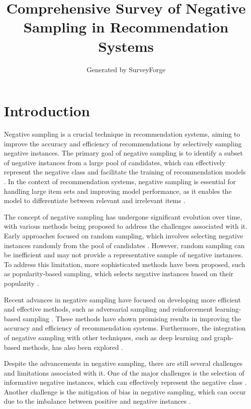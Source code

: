 \documentclass[11pt,a4paper]{article}
\title{Comprehensive Survey of Negative Sampling in Recommendation Systems}
\author{Generated by SurveyForge}
\date{}
\begin{document}
\maketitle
\tableofcontents
\newpage



\section{Introduction}


Negative sampling is a crucial technique in recommendation systems, aiming to improve the accuracy and efficiency of recommendations by selectively sampling negative instances. The primary goal of negative sampling is to identify a subset of negative instances from a large pool of candidates, which can effectively represent the negative class and facilitate the training of recommendation models \cite{arxiv:1410.8251}. In the context of recommendation systems, negative sampling is essential for handling large item sets and improving model performance, as it enables the model to differentiate between relevant and irrelevant items \cite{doi:10.1145/3097983.3098202}.

The concept of negative sampling has undergone significant evolution over time, with various methods being proposed to address the challenges associated with it. Early approaches focused on random sampling, which involves selecting negative instances randomly from the pool of candidates \cite{doi:10.1137/1.9781611972818.33}. However, random sampling can be inefficient and may not provide a representative sample of negative instances. To address this limitation, more sophisticated methods have been proposed, such as popularity-based sampling, which selects negative instances based on their popularity \cite{doi:10.1145/2983323.2983874}.

Recent advances in negative sampling have focused on developing more efficient and effective methods, such as adversarial sampling and reinforcement learning-based sampling \cite{doi:10.1145/3366424.3386195}. These methods have shown promising results in improving the accuracy and efficiency of recommendation systems. Furthermore, the integration of negative sampling with other techniques, such as deep learning and graph-based methods, has also been explored \cite{doi:10.1145/3394486.3403218}.

Despite the advancements in negative sampling, there are still several challenges and limitations associated with it. One of the major challenges is the selection of informative negative instances, which can effectively represent the negative class \cite{doi:10.1109/cvpr.2019.01155}. Another challenge is the mitigation of bias in negative sampling, which can occur due to the imbalance between positive and negative instances \cite{doi:10.1007/s40747-024-01649-z}.
\end{document}
